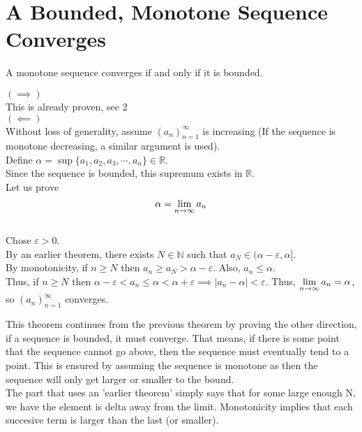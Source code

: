 \documentclass[12pt]{article}
\begin{document}
\section{A Bounded, Monotone Sequence Converges}
\begin{theo}{}
    A monotone sequence converges if and only if it is bounded.
\end{theo}
\begin{prf}{}
    $\left(\implies\right)$\\ This is already proven, see 2\\
$\left(\impliedby\right)$\\ Without loss of generality, assume $(a_n)_{n=1}^\infty$ is increasing (If the sequence is monotone decreasing, a similar argument is used).\\ Define $\alpha = \sup\{a_1, a_2, a_3, \cdots, a_n\} \in \mathbb R$.\\ Since the sequence is bounded, this supremum exists in $\mathbb R$. \\
Let us prove $$\alpha = \displaystyle\lim_{n\to\infty}{a_n}$$ \\ Chose $\varepsilon > 0$. \\By an earlier theorem, there exists $N \in \mathbb N$ such that $a_N \in (\alpha - \varepsilon, \alpha]$.\\ By monotonicity, if $n\ge N$ then $a_n \ge a_N > \alpha - \varepsilon$. Also, $a_n \le \alpha$. \\ Thus, if $n \ge N$ then $\alpha - \varepsilon < a_n \le \alpha < \alpha + \varepsilon \implies |a_n - \alpha| < \varepsilon$. Thus, $\displaystyle\lim_{n\to \infty}{a_n} = \alpha$, so $(a_n)_{n=1}^\infty$ converges.\\
\end{prf}
\begin{explanation}{}
    This theorem continues from the previous theorem by proving the other direction, if a sequence is bounded, it must converge. That means, if there is some point that the sequence cannot go above, then the sequence must eventually tend to a point. This is ensured by assuming the sequence is monotone as then the sequence will only get larger or smaller to the bound.\\
    The part that uses an 'earlier theorem' simply says that for some large enough N, we have the element is delta away from the limit. Monotonicity implies that each succesive term is larger than the last (or smaller).
\end{explanation}
\end{document}
